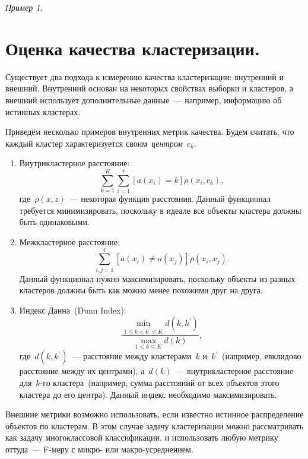 \documentclass[a4paper, 12pt]{article}
\theoremstyle{plain} %
\theoremstyle{definition} %
\theoremstyle{remark} %
\newtheorem{example}{Пример}
\begin{document}
\begin{example}
\section{Оценка качества кластеризации.}

Существует два подхода к измерению качества кластеризации: внутренний и внешний.
Внутренний основан на некоторых свойствах выборки и кластеров,
а внешний использует дополнительные данные~--- например, информацию об истинных кластерах.

Приведём несколько примеров внутренних метрик качества.
Будем считать, что каждый кластер характеризуется своим~\emph{центром}~$c_k$.
\begin{enumerate}
    \item Внутрикластерное расстояние:
        \begin{equation}
        \label{eq:intracluster}
            \sum_{k = 1}^{K}
            \sum_{i = 1}^{\ell}
                [a(x_i) = k]
                \rho(x_i, c_k),
        \end{equation}
        где~$\rho(x, z)$~--- некоторая функция расстояния.
        Данный функционал требуется минимизировать, поскольку в идеале
        все объекты кластера должны быть одинаковыми.
    \item Межкластерное расстояние:
        \[
            \sum_{i, j = 1}^{\ell}
                [a(x_i) \neq a(x_j)]
                \rho(x_i, x_j).
        \]
        Данный функционал нужно максимизировать, поскольку
        объекты из разных кластеров должны быть как можно менее похожими друг на друга.
    \item Индекс Данна~(Dunn Index):
        \[
            \frac{
                \underset{1 \leq k < k^\prime \leq K}{\min}
                    d(k, k^\prime)
            }{
                \underset{1 \leq k \leq K}{\max}
                    d(k)
            },
        \]
        где~$d(k, k^\prime)$~--- расстояние между кластерами~$k$ и~$k^\prime$~(например, евклидово расстояние
        между их центрами), а~$d(k)$~--- внутрикластерное расстояние для~$k$-го кластера~(например,
        сумма расстояний от всех объектов этого кластера до его центра).
        Данный индекс необходимо максимизировать.
\end{enumerate}

Внешние метрики возможно использовать, если известно истинное распределение объектов по кластерам.
В этом случае задачу кластеризации можно рассматривать как задачу многоклассовой классификации,
и использовать любую метрику оттуда~--- F-меру с микро- или макро-усреднением.


\end{example}
\end{document}
